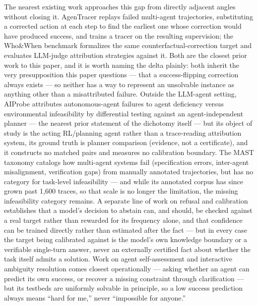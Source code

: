 \documentclass[11pt]{article}
\begin{document}
The nearest existing work approaches this gap from directly adjacent angles without closing it. AgenTracer \citep{AgenTracer05D} replays failed multi-agent trajectories, substituting a corrected action at each step to find the earliest one whose correction would have produced success, and trains a tracer on the resulting supervision; the Who\&When benchmark \citep{WhoWhen0212} formalizes the same counterfactual-correction target and evaluates LLM-judge attribution strategies against it. Both are the closest prior work to this paper, and it is worth naming the delta plainly: both inherit the very presupposition this paper questions --- that a success-flipping correction always exists --- so neither has a way to represent an unsolvable instance as anything other than a misattributed failure. Outside the LLM-agent setting, AIProbe \citep{AIProbe3870} attributes autonomous-agent failures to agent deficiency versus environmental infeasibility by differential testing against an agent-independent planner --- the nearest prior statement of the dichotomy itself --- but its object of study is the acting RL/planning agent rather than a trace-reading attribution system, its ground truth is planner comparison (evidence, not a certificate), and it constructs no matched pairs and measures no calibration boundary. The MAST taxonomy \citep{MAST3657} catalogs how multi-agent systems fail (specification errors, inter-agent misalignment, verification gaps) from manually annotated trajectories, but has no category for task-level infeasibility --- and while its annotated corpus has since grown past 1{,}600 traces, so that scale is no longer the limitation, the missing infeasibility category remains. A separate line of work on refusal and calibration \citep{RefusalIdx7Rat,RLCR49zdHm,TrustEscBPO} establishes that a model's decision to abstain can, and should, be checked against a real target rather than rewarded for its frequency alone, and that confidence can be trained directly rather than estimated after the fact --- but in every case the target being calibrated against is the model's own knowledge boundary or a verifiable single-turn answer, never an externally certified fact about whether the task itself admits a solution. Work on agent self-assessment and interactive ambiguity resolution \citep{KnowCapable4661,SilenceGold0yf,EHRChatQABz7k} comes closest operationally --- asking whether an agent can predict its own success, or recover a missing constraint through clarification --- but its testbeds are uniformly solvable in principle, so a low success prediction always means ``hard for me,'' never ``impossible for anyone.''
\end{document}

